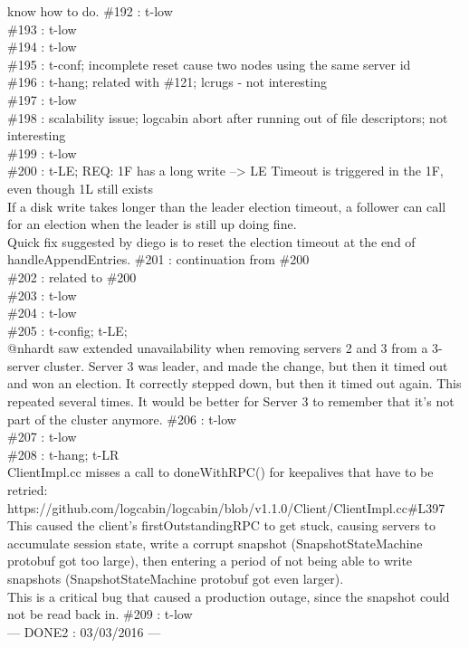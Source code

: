 know how to do.
\#192 : t-low\\
\#193 : t-low\\
\#194 : t-low\\
\#195 : t-conf; incomplete reset cause two nodes using the same server id\\
\#196 : t-hang; related with \#121; lcrugs - not interesting\\
\#197 : t-low\\
\#198 : scalability issue; logcabin abort after running out of file descriptors; not interesting\\
\#199 : t-low\\
\#200 : t-LE; REQ: 1F has a long write --> LE Timeout is triggered in the 1F, even
though 1L still exists\\
If a disk write takes longer than the leader election timeout, a follower 
can call for an election when the leader is still up doing fine.\\
Quick fix suggested by diego is to reset the election timeout at the 
end of handleAppendEntries.
\#201 : continuation from \#200\\
\#202 : related to \#200\\
\#203 : t-low\\
\#204 : t-low\\
\#205 : t-config; t-LE;\\
@nhardt saw extended unavailability when removing servers 2 and 
3 from a 3-server cluster. Server 3 was leader, and made the change, 
but then it timed out and won an election. It correctly stepped down, 
but then it timed out again. This repeated several times. It would be 
better for Server 3 to remember that it's not part of the cluster 
anymore.
\#206 : t-low\\
\#207 : t-low\\
\#208 : t-hang; t-LR\\
ClientImpl.cc misses a call to doneWithRPC() for keepalives that 
have to be retried:
https://github.com/logcabin/logcabin/blob/v1.1.0/Client/ClientImpl.cc#L397
This caused the client's firstOutstandingRPC to get stuck, causing 
servers to accumulate session state, write a corrupt snapshot 
(SnapshotStateMachine protobuf got too large), then entering a 
period of not being able to write snapshots (SnapshotStateMachine 
protobuf got even larger).\\
This is a critical bug that caused a production outage, since the snapshot 
could not be read back in.
\#209 : t-low\\
--- DONE2 : 03/03/2016 ---